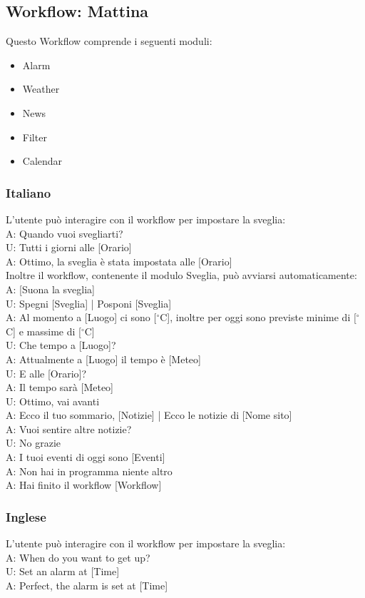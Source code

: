 \subsection{Workflow: Mattina}
Questo Workflow comprende i seguenti moduli:
\begin{itemize}
	\item Alarm
	\item Weather
	\item News
	\item Filter
	\item Calendar
\end{itemize}

\subsubsection{Italiano}
L'utente può interagire con il workflow per impostare la sveglia:\\
A: Quando vuoi svegliarti?\\
U: Tutti i giorni alle [Orario]\\
A: Ottimo, la sveglia è stata impostata alle [Orario] \\

Inoltre il workflow, contenente il modulo Sveglia, può avviarsi automaticamente:\\
A: [Suona la sveglia]\\
U: Spegni [Sveglia] | Posponi [Sveglia]\\
A: Al momento a [Luogo] ci sono [$^\circ$C], inoltre per oggi sono previste minime di [$^\circ$C] e massime di [$^\circ$C]\\
U: Che tempo a [Luogo]?\\
A: Attualmente a [Luogo] il tempo è [Meteo]\\
U: E alle [Orario]?\\
A: Il tempo sarà [Meteo]\\
U: Ottimo, vai avanti\\
A: Ecco il tuo sommario, [Notizie] | Ecco le notizie di [Nome sito]\\
A: Vuoi sentire altre notizie?\\ 
U: No grazie\\
A: I tuoi eventi di oggi sono [Eventi]\\
A: Non hai in programma niente altro\\
A: Hai finito il workflow [Workflow]

\subsubsection{Inglese}
L'utente può interagire con il workflow per impostare la sveglia:\\
A: When do you want to get up?\\
U: Set an alarm at [Time]\\
A: Perfect, the alarm is set at [Time]\\

